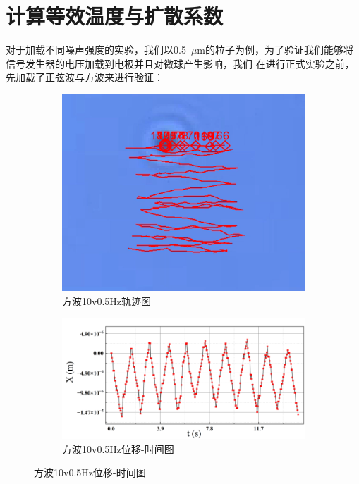 \documentclass[a4paper]{report} %
\begin{document}
\section{计算等效温度与扩散系数}
对于加载不同噪声强度的实验，我们以0.5~$\mu$m的粒子为例，为了验证我们能够将信号发生器的电压加载到电极并且对微球产生影响，我们
在进行正式实验之前，先加载了正弦波与方波来进行验证：\par
\begin{figure}[H]
    \centering
    \begin{subfigure}{0.25\textwidth}
        \includegraphics[width=\linewidth]{10v0.5Hz.png}
        \caption{方波10v0.5Hz轨迹图}
    \end{subfigure}
    \begin{subfigure}{0.45\textwidth}
        \includegraphics[width=\linewidth]{10v0.5Hz1.png}
        \caption{方波10v0.5Hz位移-时间图}
    \end{subfigure}


\end{figure}
\end{document}
